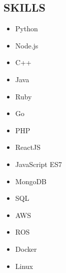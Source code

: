 \documentclass[]{res}
\begin{document}
\address{
Bachelor of Software Engineering, University of Waterloo 2018 \\
(415) 980-9210 \textbar ~paul.ashbourne@gmail.com \\
\url{www.github.com/paulashbourne} %
}
\address{855 Brannan St. APT 474 \\ \hfill San Francisco, CA \\ \hfill USA 94103}
\begin{resume}

\section{SKILLS}
\setlength\multicolsep{0pt}
\begin{multicols}{5}
  \begin{itemize}
    \item Python
    \item Node.js
    \item C++
    \item Java
    \item Ruby
    \item Go
    \item PHP
    \item ReactJS
    \item JavaScript ES7
    \item MongoDB
    \item SQL
    \item AWS
    \item ROS
    \item Docker
    \item Linux
  \end{itemize}
\end{multicols}


\end{resume}
\end{document}
